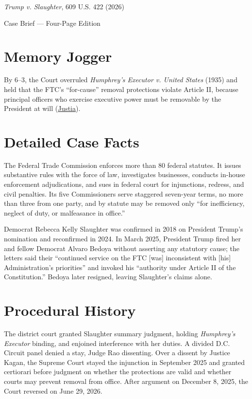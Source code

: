 \documentclass[12pt]{article}
\begin{document}
\begin{center}
{\LARGE \textit{Trump v. Slaughter}, 609 U.S. 422 (2026)\par}
\vspace{0.8em}
{\large Case Brief --- Four-Page Edition\par}
\end{center}
\vspace{1em}

\section{Memory Jogger}

By 6--3, the Court overruled \textit{Humphrey's Executor v. United States} (1935) and held that the FTC's ``for-cause'' removal protections violate Article II, because principal officers who exercise executive power must be removable by the President at will (\href{https://supreme.justia.com/cases/federal/us/609/25-332/}{Justia}).

\section{Detailed Case Facts}

The Federal Trade Commission enforces more than 80 federal statutes. It issues substantive rules with the force of law, investigates businesses, conducts in-house enforcement adjudications, and sues in federal court for injunctions, redress, and civil penalties. Its five Commissioners serve staggered seven-year terms, no more than three from one party, and by statute may be removed only ``for inefficiency, neglect of duty, or malfeasance in office.''

Democrat Rebecca Kelly Slaughter was confirmed in 2018 on President Trump's nomination and reconfirmed in 2024. In March 2025, President Trump fired her and fellow Democrat Alvaro Bedoya without asserting any statutory cause; the letters said their ``continued service on the FTC [was] inconsistent with [his] Administration's priorities'' and invoked his ``authority under Article II of the Constitution.'' Bedoya later resigned, leaving Slaughter's claims alone.

\section{Procedural History}

The district court granted Slaughter summary judgment, holding \textit{Humphrey's Executor} binding, and enjoined interference with her duties. A divided D.C. Circuit panel denied a stay, Judge Rao dissenting. Over a dissent by Justice Kagan, the Supreme Court stayed the injunction in September 2025 and granted certiorari before judgment on whether the protections are valid and whether courts may prevent removal from office. After argument on December 8, 2025, the Court reversed on June 29, 2026.
\end{document}
